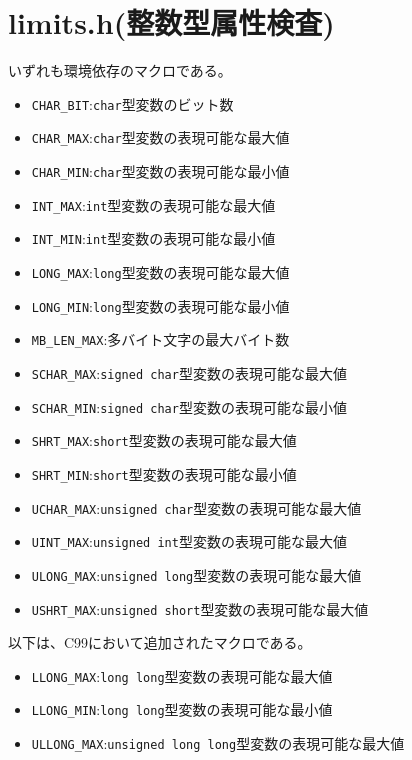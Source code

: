 \section{limits.h(整数型属性検査)}
いずれも環境依存のマクロである。
\begin{itemize}
\item \verb|CHAR_BIT|:\verb|char|型変数のビット数
\item \verb|CHAR_MAX|:\verb|char|型変数の表現可能な最大値
\item \verb|CHAR_MIN|:\verb|char|型変数の表現可能な最小値
\item \verb|INT_MAX|:\verb|int|型変数の表現可能な最大値
\item \verb|INT_MIN|:\verb|int|型変数の表現可能な最小値
\item \verb|LONG_MAX|:\verb|long|型変数の表現可能な最大値
\item \verb|LONG_MIN|:\verb|long|型変数の表現可能な最小値
\item \verb|MB_LEN_MAX|:多バイト文字の最大バイト数
\item \verb|SCHAR_MAX|:\verb|signed char|型変数の表現可能な最大値
\item \verb|SCHAR_MIN|:\verb|signed char|型変数の表現可能な最小値
\item \verb|SHRT_MAX|:\verb|short|型変数の表現可能な最大値
\item \verb|SHRT_MIN|:\verb|short|型変数の表現可能な最小値
\item \verb|UCHAR_MAX|:\verb|unsigned char|型変数の表現可能な最大値
\item \verb|UINT_MAX|:\verb|unsigned int|型変数の表現可能な最大値
\item \verb|ULONG_MAX|:\verb|unsigned long|型変数の表現可能な最大値
\item \verb|USHRT_MAX|:\verb|unsigned short|型変数の表現可能な最大値
\end{itemize}
以下は、C99において追加されたマクロである。
\begin{itemize}
\item \verb|LLONG_MAX|:\verb|long long|型変数の表現可能な最大値
\item \verb|LLONG_MIN|:\verb|long long|型変数の表現可能な最小値
\item \verb|ULLONG_MAX|:\verb|unsigned long long|型変数の表現可能な最大値
\end{itemize}

